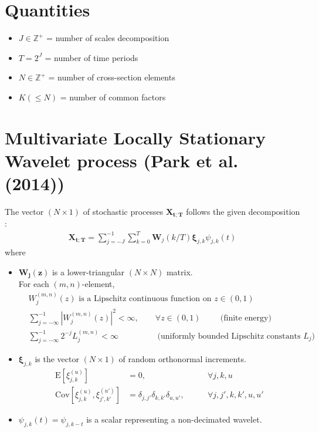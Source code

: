 \documentclass{article}
\numberwithin{equation}{section}
\let \oldsum \sum
\renewcommand{\sum}{\displaystyle \oldsum}
\newcommand{\abs}[1]{\left \lvert #1 \right \rvert}
\newcommand{\X}[1]{\bm{X_{#1;T}}}
\newcommand{\W}[2]{\bm{W}_{#1}\left(#2/T\right)}
\newcommand{\wavelet}[3]{\psi_{#1,#2}(#3)}
\newcommand{\increment}[2]{\bm{\xi}_{#1,#2}}
\newcommand{\eincrement}[3]{\xi_{#2,#3}^{(#1)}}
\newcommand{\scalesum}{\sum_{j=-J}^{-1}}
\newcommand{\locsum}{\sum_{k=0}^{T}}
\newcommand{\kronecker}[2]{\delta_{#1,#2}}
\newcommand{\E}[1]{\mathrm{E}\left[#1\right]}
\newcommand{\Cov}[2]{\mathrm{Cov}\left[#1,#2\right]}
\begin{document}
\section{Quantities}
	\begin{itemize}
		\item $J \in \mathbb{Z}^{+}$ = number of scales decomposition
		\item $T = 2^{J}$ = number of time periods 
		\item $N \in \mathbb{Z}^{+}$ = number of cross-section elements
		\item $K (\leq N)$ = number of common factors
	\end{itemize}

\section{Multivariate Locally Stationary Wavelet process (Park et al. (2014))}
	The vector $(N \times 1)$ of stochastic processes $\X{t}$ follows the given decomposition : 
	\begin{align}\label{eq:lswStructure}
		 \X{t} = \scalesum \locsum \W{j}{k} \increment{j}{k} \wavelet{j}{k}{t} 
	\end{align}
	where 
	\begin{itemize}
		\item $\bm{W_{j}(z)}$ is a lower-triangular $(N \times N)$ matrix. \\ 
			For each $(m,n)$-element, 
			\begin{align}
				 &W_{j}^{(m,n)}(z) \text{ is a Lipschitz continuous function on } z \in (0,1) \\
				 &\sum_{j=-\infty}^{-1} \abs{W_{j}^{(m,n)}(z)}^{2} < \infty, \qquad \forall z \in (0,1) \hspace{1cm} \text{(finite energy)}\\
				 &\sum_{j=-\infty}^{-1} 2^{-j}L_{j}^{(m,n)} < \infty  \hspace{2cm} \text{(uniformly bounded Lipschitz constants $L_{j}$)}
			\end{align}
		\item $\increment{j}{k}$ is the vector $(N \times 1)$ of random orthonormal increments.
			\begin{align}
				\E{\eincrement{u}{j}{k}} &= 0, \qquad &\forall j,k,u \\ \label{eq:indepIncrements}
				\Cov{\eincrement{u}{j}{k}}{\eincrement{u'}{j'}{k'}} &= \kronecker{j}{j'}\kronecker{k}{k'}\kronecker{u}{u'}, \qquad &\forall j,j',k,k',u,u' 
			\end{align}

		\item $\wavelet{j}{k}{t} = \psi_{j,k-t}$ is a scalar representing a non-decimated wavelet.
	\end{itemize}
\end{document}
